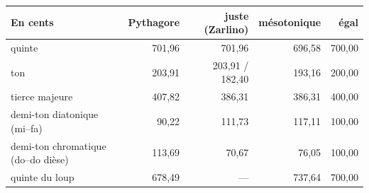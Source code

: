 
\begin{tabular}{@{}l r r r r@{}}
\toprule
\textbf{En cents} & \textbf{Pythagore} & \textbf{juste (Zarlino)} & \textbf{mésotonique} & \textbf{égal} \\
\midrule
quinte & 701{,}96 & 701{,}96 & 696{,}58 & 700{,}00 \\
ton & 203{,}91 & 203{,}91 / 182{,}40 & 193{,}16 & 200{,}00 \\
tierce majeure & 407{,}82 & 386{,}31 & 386{,}31 & 400{,}00 \\
demi-ton diatonique (mi--fa) & 90{,}22 & 111{,}73 & 117{,}11 & 100{,}00 \\
demi-ton chromatique (do--do dièse) & 113{,}69 & 70{,}67 & 76{,}05 & 100{,}00 \\
quinte du loup & 678{,}49 & --- & 737{,}64 & 700{,}00 \\
\bottomrule
\end{tabular}
